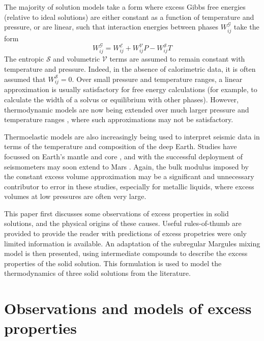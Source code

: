 The majority of solution models take a form where excess Gibbs free energies (relative to ideal solutions) are either constant as a function of temperature and pressure, or are linear, such that interaction energies between phases $W_{ij}^{\mathcal{G}}$ take the form
\begin{equation}
  W_{ij}^{\mathcal{G}} = W_{ij}^{\mathcal{E}} + W_{ij}^{\mathcal{V}}P - W_{ij}^{\mathcal{S}}T
  \label{eqn:trad_form}
\end{equation}
The entropic $\mathcal{S}$ and volumetric $\mathcal{V}$ terms are assumed to remain constant with temperature and pressure. Indeed, in the absence of calorimetric data, it is often assumed that $W_{ij}^{\mathcal{S}} = 0$. Over small pressure and temperature ranges, a linear approximation is usually satisfactory for free energy calculations (for example, to calculate the width of a solvus or equilibrium with other phases). However, thermodynamic models are now being extended over much larger pressure and temperature ranges \citep{SLB2011, HP2011, HHPH2013, DKS2013}, where such approximations may not be satisfactory.

Thermoelastic models are also increasingly being used to interpret seismic data in terms of the temperature and composition of the deep Earth. Studies have focussed on Earth's mantle \citep[e.g.][]{DGDSBR2012, MCDRT2012, DCT2012} and core \citep[e.g.][]{SGGFMM2000,SFGMM2004}, and with the successful deployment of seismometers may soon extend to Mars \citep{GLZR2014}. Again, the bulk modulus imposed by the constant excess volume approximation may be a significant and unnecessary contributor to error in these studies, especially for metallic liquids, where excess volumes at low pressures are often very large. 

This paper first discusses some observations of excess properties in solid solutions, and the physical origins of these causes. Useful rules-of-thumb are provided to provide the reader with predictions of excess propetries were only limited information is available. An adaptation of the subregular Margules mixing model is then presented, using intermediate compounds to describe the excess properties of the solid solution. This formulation is used to model the thermodynamics of three solid solutions from the literature. 


\section{Observations and models of excess properties} 
